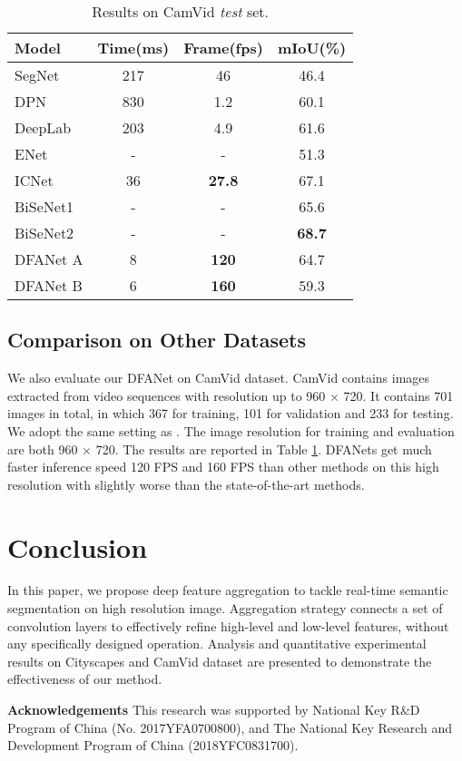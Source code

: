 \documentclass[10pt,twocolumn,letterpaper]{article}
\begin{document}
\begin{table}
\begin{center}
\begin{tabular}{|l|c|c|c|}
\hline
Model & Time(ms) & Frame(fps) & mIoU(\%) \\
\hline\hline
SegNet\cite{segnet}    & 217 & 46   & 46.4 \\
DPN\cite{dfn}          & 830 & 1.2  & 60.1 \\
DeepLab\cite{DeepLab2} & 203 & 4.9  & 61.6 \\
ENet\cite{enet}        & -   & -    & 51.3 \\
ICNet\cite{ICNet}      & 36  & \textbf{27.8} & 67.1 \\
BiSeNet1\cite{BiSeNet} & -   & -    & 65.6 \\
BiSeNet2\cite{BiSeNet} & -   & -    & \textbf{68.7} \\
\hline
DFANet A               & 8  & \textbf{120}  & 64.7 \\
DFANet B               & 6  & \textbf{160}  & 59.3 \\
\hline
\end{tabular}
\end{center}
\caption{Results on CamVid \textit{test} set. }
\label{tab:CamVid Results}
\end{table}

\subsection{Comparison on Other Datasets}
We also evaluate our DFANet on CamVid dataset. 
CamVid contains images extracted from video sequences with resolution up to 960 $\times$ 720. 
It contains 701 images in total, in which 367 for training, 101 for validation and 233 for testing. We adopt the same setting as \cite{CamVid_set}.
The image resolution for training and evaluation are both 960 $\times$ 720. The results are reported in Table \ref{tab:CamVid Results}. DFANets get much faster inference speed 120 FPS and 160 FPS than other methods on this high resolution with slightly worse than the state-of-the-art methods\cite{ICNet}.


\section{Conclusion}
In this paper, we propose deep feature aggregation to tackle real-time semantic segmentation on high resolution image. Aggregation strategy connects a set of convolution layers to effectively refine high-level and low-level features, without any specifically designed operation. Analysis and quantitative experimental results on Cityscapes and CamVid dataset are presented to demonstrate the effectiveness of our method.

\textbf{Acknowledgements} This research was supported by National Key R\&D Program of China (No. 2017YFA0700800), and The National Key Research and Development Program of China (2018YFC0831700). 


{\small


}
\end{document}
